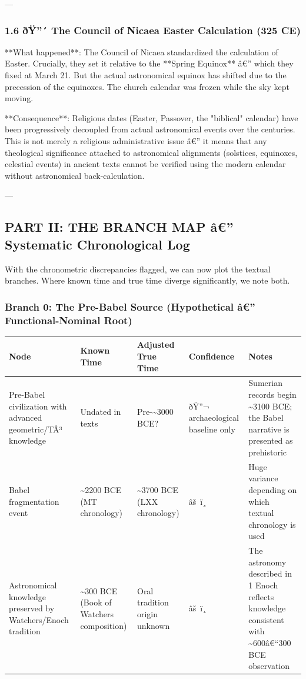 \documentclass[aps,prd,11pt,onecolumn,superscriptaddress,nofootinbib,floatfix]{revtex4-2}
\begin{document}
---


\subsubsection{1.6 ðŸ''´ The Council of Nicaea Easter Calculation (325 CE)}


**What happened**: The Council of Nicaea standardized the calculation of Easter. Crucially, they set it relative to the **Spring Equinox** â€'' which they fixed at March 21. But the actual astronomical equinox has shifted due to the precession of the equinoxes. The church calendar was frozen while the sky kept moving.


**Consequence**: Religious dates (Easter, Passover, the "biblical" calendar) have been progressively decoupled from actual astronomical events over the centuries. This is not merely a religious administrative issue â€'' it means that any theological significance attached to astronomical alignments (solstices, equinoxes, celestial events) in ancient texts cannot be verified using the modern calendar without astronomical back-calculation.


---


\subsection{PART II: THE BRANCH MAP â€'' Systematic Chronological Log}


With the chronometric discrepancies flagged, we can now plot the textual branches. Where known time and true time diverge significantly, we note both.


\subsubsection{Branch 0: The Pre-Babel Source (Hypothetical â€'' Functional-Nominal Root)}


\begin{table}[h!]
\centering
\begin{tabular}{p{3cm}p{3cm}p{3cm}p{3cm}p{3cm}}
\hline
Node & Known Time & Adjusted True Time & Confidence & Notes \\
\hline
Pre-Babel civilization with advanced geometric/TÂ³ knowledge & Undated in texts & Pre-\textasciitilde{}3000 BCE? & ðŸ''¬ archaeological baseline only & Sumerian records begin \textasciitilde{}3100 BCE; the Babel narrative is presented as prehistoric \\
Babel fragmentation event & \textasciitilde{}2200 BCE (MT chronology) & \textasciitilde{}3700 BCE (LXX chronology) & âš ï¸ & Huge variance depending on which textual chronology is used \\
Astronomical knowledge preserved by Watchers/Enoch tradition & \textasciitilde{}300 BCE (Book of Watchers composition) & Oral tradition origin unknown & âš ï¸ & The astronomy described in 1 Enoch reflects knowledge consistent with \textasciitilde{}600â€``300 BCE observation \\
\hline
\end{tabular}
\end{table}
\end{document}
